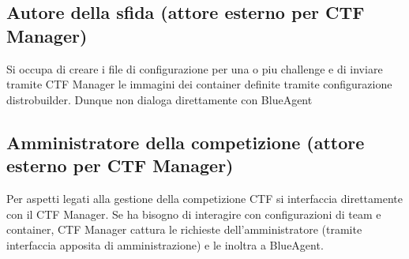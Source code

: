 \subsection{Autore della sfida (attore esterno per CTF
Manager)}\label{autore-della-sfida-attore-esterno-per-ctf-manager}

Si occupa di creare i file di configurazione per una o piu challenge e
di inviare tramite CTF Manager le immagini dei container definite
tramite configurazione distrobuilder. Dunque non dialoga direttamente
con BlueAgent

\subsection{Amministratore della competizione (attore esterno per CTF
Manager)}\label{amministratore-della-competizione-attore-esterno-per-ctf-manager}

Per aspetti legati alla gestione della competizione CTF si interfaccia
direttamente con il CTF Manager. Se ha bisogno di interagire con
configurazioni di team e container, CTF Manager cattura le richieste
dell'amministratore (tramite interfaccia apposita di amministrazione) e
le inoltra a BlueAgent.
